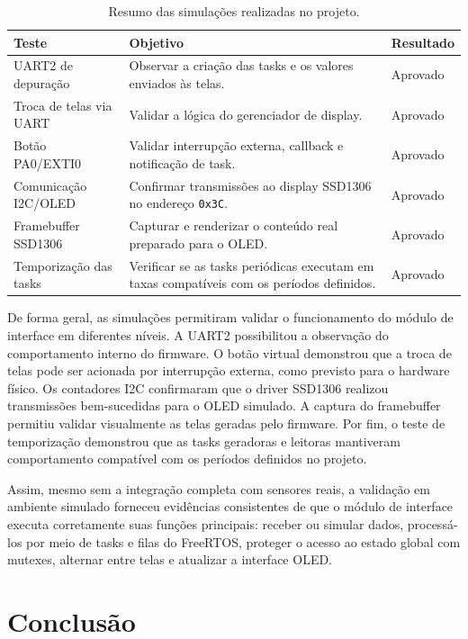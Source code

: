 \documentclass[a4paper,10pt]{article}
\begin{document}
\begin{table}[h]
\centering
\renewcommand{\arraystretch}{1.3}
\begin{tabular}{|p{4.3cm}|p{6.8cm}|p{2.8cm}|}
\hline
\textbf{Teste} & \textbf{Objetivo} & \textbf{Resultado} \\
\hline
UART2 de depuração & Observar a criação das tasks e os valores enviados às telas. & Aprovado \\
\hline
Troca de telas via UART & Validar a lógica do gerenciador de display. & Aprovado \\
\hline
Botão PA0/EXTI0 & Validar interrupção externa, callback e notificação de task. & Aprovado \\
\hline
Comunicação I2C/OLED & Confirmar transmissões ao display SSD1306 no endereço \texttt{0x3C}. & Aprovado \\
\hline
Framebuffer SSD1306 & Capturar e renderizar o conteúdo real preparado para o OLED. & Aprovado \\
\hline
Temporização das tasks & Verificar se as tasks periódicas executam em taxas compatíveis com os períodos definidos. & Aprovado \\
\hline
\end{tabular}
\caption{Resumo das simulações realizadas no projeto.}
\label{tab:resumo_simulacoes}
\end{table}

De forma geral, as simulações permitiram validar o funcionamento do módulo de interface em diferentes níveis. A UART2 possibilitou a observação do comportamento interno do firmware. O botão virtual demonstrou que a troca de telas pode ser acionada por interrupção externa, como previsto para o hardware físico. Os contadores I2C confirmaram que o driver SSD1306 realizou transmissões bem-sucedidas para o OLED simulado. A captura do framebuffer permitiu validar visualmente as telas geradas pelo firmware. Por fim, o teste de temporização demonstrou que as tasks geradoras e leitoras mantiveram comportamento compatível com os períodos definidos no projeto.

Assim, mesmo sem a integração completa com sensores reais, a validação em ambiente simulado forneceu evidências consistentes de que o módulo de interface executa corretamente suas funções principais: receber ou simular dados, processá-los por meio de tasks e filas do FreeRTOS, proteger o acesso ao estado global com mutexes, alternar entre telas e atualizar a interface OLED.
\section{Conclusão}
\end{document}
